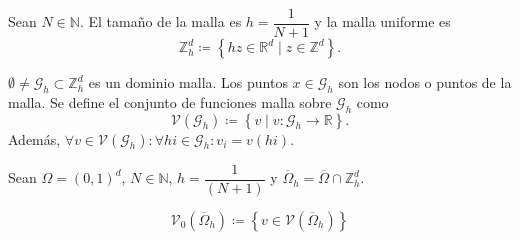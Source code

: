 \begin{definition}
    Sean $N\in\mathbb{N}$.
    El tamaño de la malla es
    \begin{math}
        h=
        \dfrac{1}{N+1}
    \end{math}
    y la malla uniforme es
    \begin{equation*}
        \mathbb{Z}^{d}_{h}\coloneqq
        \left\{
        hz\in\mathbb{R}^{d}\mid
        z\in\mathbb{Z}^{d}
        \right\}.
    \end{equation*}
\end{definition}

\begin{definition}
    \begin{math}
        \emptyset\neq\mathcal{G}_{h}\subset
        \mathbb{Z}^{d}_{h}
    \end{math}
    es un dominio malla.
    Los puntos $x\in\mathcal{G}_{h}$ son los nodos o puntos de la
    malla.
    Se define el conjunto de funciones malla sobre $\mathcal{G}_{h}$
    como
    \begin{equation*}
        \mathcal{V}
        \left(\mathcal{G}_{h}\right)\coloneqq
        \left\{
        v\mid v\colon\mathcal{G}_{h}\to\mathbb{R}
        \right\}.
    \end{equation*}
    Además,
    \begin{math}
        \forall v\in\mathcal{V}\left(\mathcal{G}_{h}\right):
        \forall hi\in\mathcal{G}_{h}:
        v_{i}=
        v\left(hi\right)
    \end{math}.
\end{definition}

\begin{definition}
    Sean
    \begin{math}
        \Omega=
        {\left(0,1\right)}^{d}
    \end{math},
    \begin{math}
        N\in\mathbb{N}
    \end{math},
    \begin{math}
        h=
        \dfrac{1}{\left(N+1\right)}
    \end{math}
    y
    \begin{math}
        \overline{\Omega}_{h}=
        \overline{\Omega}\cap
        \mathbb{Z}^{d}_{h}
    \end{math}.

    \begin{equation*}
        \mathcal{V}_{0}\left(\overline{\Omega}_{h}\right)\coloneqq
        \left\{
        v\in\mathcal{V}\left(\overline{\Omega}_{h}\right)
        \right\}
    \end{equation*}
\end{definition}

